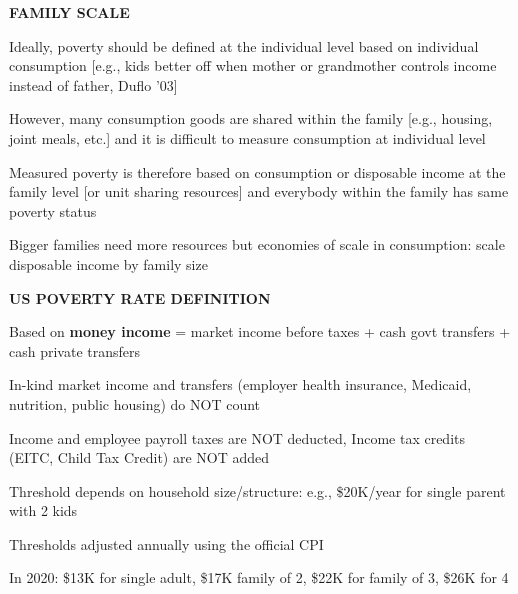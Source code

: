 \documentclass[landscape]{slides}
\begin{document}
\begin{slide}
\begin{center}
{\bf FAMILY SCALE}
\end{center}
Ideally, poverty should be defined at the individual level based
on individual consumption [e.g., kids better off when mother or
grandmother controls income instead of father, Duflo '03]

However, many consumption goods are shared within the family
[e.g., housing, joint meals, etc.] and it is difficult to measure consumption
at individual level

Measured poverty is therefore based on consumption or disposable
income at the family level [or unit sharing resources] and
everybody within the family has same poverty status

Bigger families need more resources but economies of scale in
consumption: scale disposable income by family size

\end{slide}

%
%
%
%
%



\begin{slide}
\begin{center}
{\bf US POVERTY RATE DEFINITION}
\end{center}
Based on {\bf money income} = market income before taxes + cash
govt transfers + cash private transfers

In-kind market income and transfers (employer health insurance,
Medicaid, nutrition, public housing) do NOT count

Income and employee payroll taxes are NOT deducted, Income tax
credits (EITC, Child Tax Credit) are NOT added

Threshold depends on household size/structure: e.g., \$20K/year
for single parent with 2 kids

Thresholds adjusted annually using the official CPI

In 2020: \$13K for single adult, \$17K family of 2, \$22K for family of 3, \$26K for 4

\end{slide}
\end{document}
